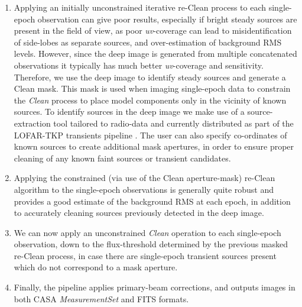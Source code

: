 \documentclass[5p,authoryear]{elsarticle}
\begin{document}
\begin{enumerate}[I]
 \item Applying an initially unconstrained iterative re-Clean process to each single-epoch observation can give poor results, especially if bright steady sources are present in the field of view, as poor \textit{uv}-coverage can lead to misidentification of side-lobes as separate sources,  and over-estimation of background RMS levels. 
 However, since the deep image is generated from multiple concatenated observations it typically has much better \textit{uv}-coverage and sensitivity. Therefore, we use the deep image to identify steady sources and generate a Clean mask. 
 This mask is used when imaging single-epoch data to constrain the \textit{Clean} process to place model components only in the vicinity of known sources. 
 To identify sources in the deep image we make use of a source-extraction tool tailored to radio-data and currently distributed as part of the LOFAR-TKP transients pipeline \citep{Trap2014,Swinbank2015}.
 The user can also specify co-ordinates of known sources to create additional mask apertures, in order to ensure proper cleaning of any known faint sources or transient candidates. 
 
 \item  Applying the constrained (via use of the Clean aperture-mask) re-Clean algorithm to the single-epoch observations is generally quite robust and provides a good estimate of the background RMS at each epoch, in addition to accurately cleaning sources previously detected in the deep image.
 
 \item We can now apply an unconstrained \textit{Clean} operation to each single-epoch observation, down to the flux-threshold determined by the previous masked re-Clean process, in case there are single-epoch transient sources present which do not correspond to a mask aperture. 
 \item Finally, the pipeline applies primary-beam corrections, and outputs images in both CASA \textit{MeasurementSet} and FITS formats.
\end{enumerate}
\end{document}
